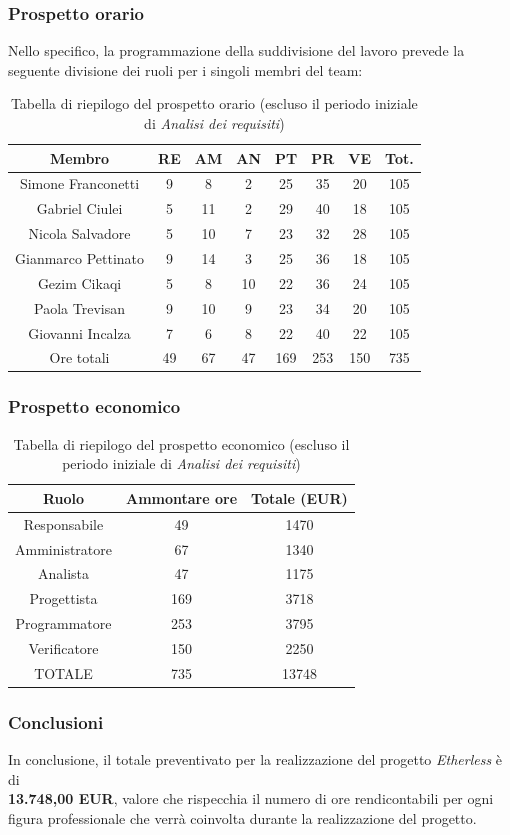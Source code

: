 \subsubsection{Prospetto orario}
Nello specifico, la programmazione della suddivisione del lavoro prevede la seguente divisione dei ruoli per i singoli membri del team:
\begin{table}[h]
	\caption{Tabella di riepilogo del prospetto orario (escluso il periodo iniziale di \textit{Analisi dei requisiti})}
\begin{center}
\begin{tabular}{ |c|c|c|c|c|c|c|c|  }
 \hline
 Membro 		& RE 		& AM 		& AN 	& PT 	& PR 	& VE 	& Tot.\\
 \hline\hline
 Simone	Franconetti		& 9  	 	& 8			& 2 		& 25 		& 35 		& 20 		& 105\\
 Gabriel Ciulei		& 5 			& 11 		& 2 		& 29			& 40 		& 18 		& 105\\
 Nicola	Salvadore		& 5  		& 10 		& 7 		& 23 		& 32 		& 28 		& 105\\
 Gianmarco	Pettinato	& 9   		& 14 		& 3 		& 25		 	& 36 		& 18 		& 105\\
 Gezim	Cikaqi		& 5  		& 8  		& 10		& 22 		& 36 		& 24	 	& 105\\
 Paola	Trevisan		& 9  		& 10 		& 9 		& 23 		& 34 		& 20 		& 105\\
 Giovanni	Incalza	& 7  		& 6	 		& 8 		& 22 		& 40		 	& 22  		& 105\\
 \hline\hline
 Ore totali		& 49 	& 67		& 47 	& 169 	& 253 	& 150 	& 735\\
  \hline
\end{tabular}
\end{center}
\end{table}

\newpage
\subsubsection{Prospetto economico}
\begin{table}[h]
	\caption{Tabella di riepilogo del prospetto economico (escluso il periodo iniziale di \textit{Analisi dei requisiti})}
	\begin{center}
		\begin{tabular}{ |c|c|c|  }
			\hline
			Ruolo 		& Ammontare ore 	& Totale (EUR)\\
			\hline
			\hline
			Responsabile	& 49 	& 1470\\
			Amministratore	& 67		& 1340\\
			Analista		& 47 	& 1175\\
			Progettista		& 169	& 3718\\
			Programmatore	& 253	& 3795\\
			Verificatore	& 150 	& 2250\\
			\hline\hline
			TOTALE		& 735		& 13748\\
			\hline
		\end{tabular}
	\end{center}
\end{table}

\subsubsection{Conclusioni}
In conclusione, il totale preventivato per la realizzazione del progetto \textit{Etherless} è di\\ \textbf{13.748,00 EUR}, valore che rispecchia il numero di ore rendicontabili per ogni figura professionale che verrà coinvolta durante la realizzazione del progetto.
